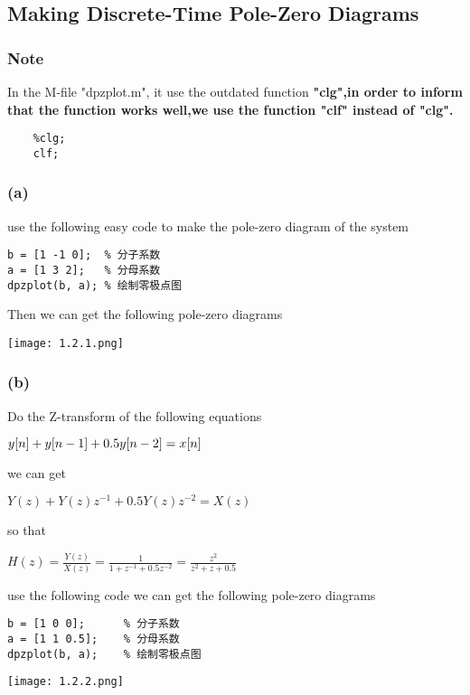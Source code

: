 \documentclass{article}
\begin{document}
\subsection{Making Discrete-Time Pole-Zero Diagrams}

\subsubsection*{Note}

In the M-file "dpzplot.m", it use the outdated function \bf{"clg"},in order to inform that the function works well,we use the function \bf{"clf"} instead of \bf{"clg"}.\\
\begin{lstlisting}
    %clg;
    clf;
\end{lstlisting}

\subsubsection*{(a)}
use the following easy code to make the pole-zero diagram of the system
\begin{lstlisting}
b = [1 -1 0];  % 分子系数
a = [1 3 2];   % 分母系数
dpzplot(b, a); % 绘制零极点图
\end{lstlisting}
Then we can get the following pole-zero diagrams
\begin{center}
    \texttt{[image: 1.2.1.png]}
\end{center}

\subsubsection*{(b)}

Do the Z-transform of the following equations
\begin{center}
    \begin{math}
        \centering
        y[n] +y[n-1] + 0.5y[n-2] = x[n]
    \end{math}
\end{center}
we can get
\begin{center}
    \begin{math}
        Y(z) + Y(z)z^{-1} + 0.5Y(z)z^{-2} = X(z)
    \end{math}
\end{center}
so that
\begin{center}
    \begin{math}
        H(z) = \frac{Y(z)}{X(z)} = \frac{1}{1+z^{-1}+0.5z^{-2}} = \frac{z^2}{z^2+z+0.5}
    \end{math}
\end{center}
use the following code we can get the following pole-zero diagrams
\begin{lstlisting}
b = [1 0 0];      % 分子系数
a = [1 1 0.5];    % 分母系数
dpzplot(b, a);    % 绘制零极点图
\end{lstlisting}
\begin{center}
    \texttt{[image: 1.2.2.png]}
\end{center}
\end{document}
